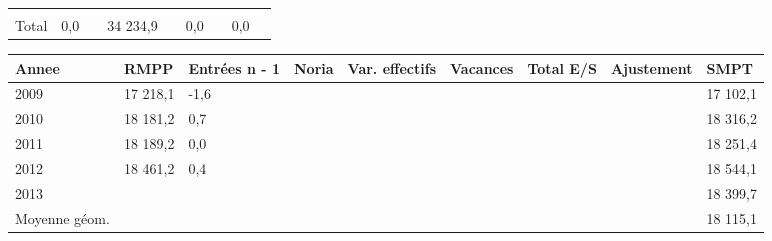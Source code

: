\begin{longtable}[]{@{}lllllllll@{}}
\begin{minipage}[t]{0.06\columnwidth}
\strut
\end{minipage} & \begin{minipage}[t]{0.13\columnwidth}\raggedright
\strut
\end{minipage} & \begin{minipage}[t]{0.06\columnwidth}\raggedright
\strut
\end{minipage} & \begin{minipage}[t]{0.05\columnwidth}\raggedright
\strut
\end{minipage} & \begin{minipage}[t]{0.06\columnwidth}\raggedright
\strut
\end{minipage}\tabularnewline
\begin{minipage}[t]{0.05\columnwidth}\raggedright
Total\strut
\end{minipage} & \begin{minipage}[t]{0.10\columnwidth}\raggedright
0,0\strut
\end{minipage} & \begin{minipage}[t]{0.06\columnwidth}\raggedright
\strut
\end{minipage} & \begin{minipage}[t]{0.17\columnwidth}\raggedright
34 234,9\strut
\end{minipage} & \begin{minipage}[t]{0.06\columnwidth}\raggedright
\strut
\end{minipage} & \begin{minipage}[t]{0.13\columnwidth}\raggedright
0,0\strut
\end{minipage} & \begin{minipage}[t]{0.06\columnwidth}\raggedright
\strut
\end{minipage} & \begin{minipage}[t]{0.05\columnwidth}\raggedright
0,0\strut
\end{minipage} & \begin{minipage}[t]{0.06\columnwidth}\raggedright
\strut
\end{minipage}\tabularnewline
\bottomrule
\end{longtable}

\begin{longtable}[]{@{}lllllllll@{}}
\toprule
Annee & RMPP & Entrées n - 1 & Noria & Var. effectifs & Vacances & Total
E/S & Ajustement & SMPT\tabularnewline
\midrule
\endhead
2009 & 17 218,1 & -1,6 & & & & & & 17 102,1\tabularnewline
2010 & 18 181,2 & 0,7 & & & & & & 18 316,2\tabularnewline
2011 & 18 189,2 & 0,0 & & & & & & 18 251,4\tabularnewline
2012 & 18 461,2 & 0,4 & & & & & & 18 544,1\tabularnewline
2013 & & & & & & & & 18 399,7\tabularnewline
Moyenne géom. & & & & & & & & 18 115,1\tabularnewline
\bottomrule
\end{longtable}

